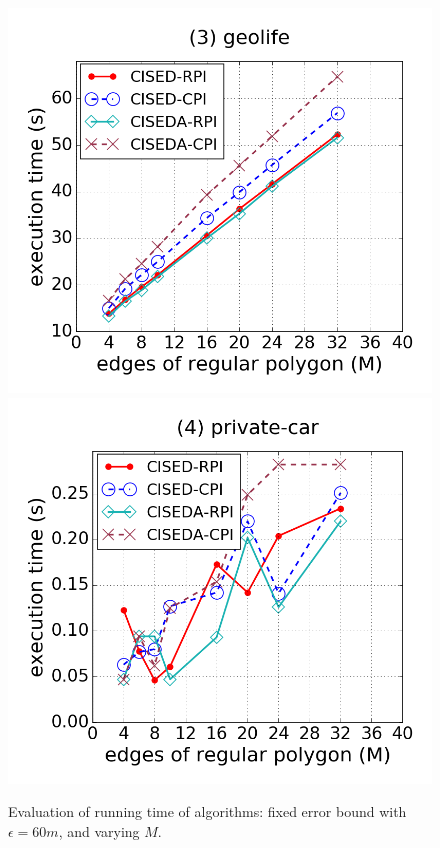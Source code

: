 \begin{figure}[tb!]
\includegraphics[scale = 0.245]{figures/Exp-M-e-60-time-geolife.png}
\includegraphics[scale = 0.245]{figures/Exp-M-e-60-time-private.png}
\vspace{-2ex}
\caption{\small Evaluation of running time of \lsa algorithms: fixed error bound with $\epsilon=60m$, and varying $M$.}
\label{fig:m-time-e20}
\vspace{-1ex}
\end{figure}


